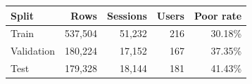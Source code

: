 \begin{tabular}{lrrrr}
\toprule
Split & Rows & Sessions & Users & Poor rate \\
\midrule
Train & 537,504 & 51,232 & 216 & 30.18\% \\
Validation & 180,224 & 17,152 & 167 & 37.35\% \\
Test & 179,328 & 18,144 & 181 & 41.43\% \\
\bottomrule
\end{tabular}
